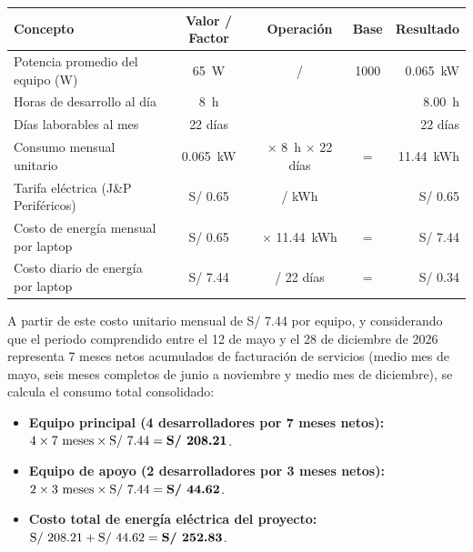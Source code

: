\par
\noindent
\begin{minipage}{\linewidth}

    \begingroup
    \renewcommand{\baselinestretch}{1}
    \footnotesize
    \setlength{\tabcolsep}{4pt}
    \renewcommand{\arraystretch}{1.25}

    \begin{tabularx}{\linewidth}{@{}p{4.8cm}c c c r@{}}
        \toprule
        \textbf{Concepto} & \textbf{Valor / Factor} & \textbf{Operación} & \textbf{Base} & \textbf{Resultado} \\ \midrule
        Potencia promedio del equipo (W) & 65~W & / & 1000 & 0.065~kW \\ 
        Horas de desarrollo al día & 8~h & & & 8.00~h \\ 
        Días laborables al mes & 22 días & & & 22 días \\ 
        Consumo mensual unitario & 0.065~kW & $\times$ 8~h $\times$ 22 días & = & 11.44~kWh \\ 
        Tarifa eléctrica (J\&P Periféricos) & S/ 0.65 & / kWh & & S/ 0.65 \\ 
        Costo de energía mensual por laptop & S/ 0.65 & $\times$ 11.44~kWh & = & S/ 7.44 \\ 
        Costo diario de energía por laptop & S/ 7.44 & / 22 días & = & S/ 0.34 \\ \bottomrule
    \end{tabularx}
    \endgroup

\end{minipage}
\finBloqueAPA

A partir de este costo unitario mensual de S/ 7.44 por equipo, y considerando que el periodo comprendido entre el 12 de mayo y 
el 28 de diciembre de 2026 representa 7 meses netos acumulados de facturación de servicios (medio mes de mayo, seis meses completos de junio a noviembre y medio mes de diciembre), 
se calcula el consumo total consolidado:

\begin{itemize}
    \item \textbf{Equipo principal (4 desarrolladores por 7 meses netos):} $4 \times 7 \text{ meses} \times \text{S/ } 7.44 = \text{\textbf{S/ 208.21}}$.
    \item \textbf{Equipo de apoyo (2 desarrolladores por 3 meses netos):} $2 \times 3 \text{ meses} \times \text{S/ } 7.44 = \text{\textbf{S/ 44.62}}$.
    \item \textbf{Costo total de energía eléctrica del proyecto:} $\text{S/ } 208.21 + \text{S/ } 44.62 = \text{\textbf{S/ 252.83}}$.
\end{itemize}

